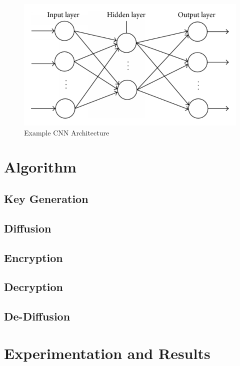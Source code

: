 \documentclass[conference]{IEEEtran}
\begin{document}
\begin{figure}[!ht]
    \centering
    \includegraphics{figures/CNN}
    \caption{Example CNN Architecture}
    \label{fig:CNN}
\end{figure}

\section{Algorithm}\label{sec:algorithm}

\subsection{Key Generation}\label{subsec:key-generation}

\subsection{Diffusion}\label{subsec:diffusion}

\subsection{Encryption}\label{subsec:encryption}

\subsection{Decryption}\label{subsec:decryption}

\subsection{De-Diffusion}\label{subsec:de-diffusion}

\section{Experimentation and Results}\label{sec:experimentation-and-results}
\end{document}
